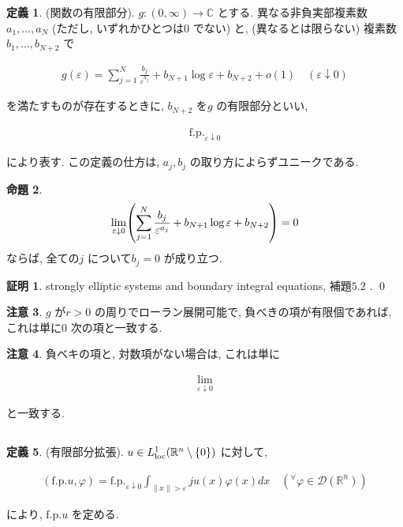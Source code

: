 \documentclass[10pt, fleqn, label-section=none]{bxjsarticle}
\theoremstyle{definition}
\newtheorem{dfn}{定義}[section]
\newtheorem{prop}[dfn]{命題}
\newtheorem*{pf*}{証明}
\newtheorem{remark}[dfn]{注意}
\newcommand{\any}{{}^{\forall}}
\newcommand{\veps}{\varepsilon}
\newcommand{\paren}[1]{\mleft( #1\mright )}
\newcommand{\cbra}[1]{\mleft\{#1\mright\}}
\newcommand{\norm}[1]{\left\|#1\right\|}
\renewcommand{\;}{\, ; \,}
\newcommand{\fp}{\textrm{f.p.}}
\begin{document}
\begin{dfn}(関数の有限部分). $g:(0, \infty)  \rightarrow \mathbb C$ とする. 異なる非負実部複素数$a_1, \ldots, a_N$ (ただし, いずれかひとつは$0$ でない) と, (異なるとは限らない) 複素数$ b_1, \ldots , b_{N+2}$ で

\begin{align*} g(\veps) = \sum_{j = 1}^N \frac{b_j}{\veps^{a_j}} + b_{N+1} \log \veps + b_{N+2} + o(1) \quad(\veps \downarrow 0)  \end{align*}

を満たすものが存在するときに, $b_{N+2}$ を$g$ の有限部分といい, 

\begin{align*} \textrm{f.p.}_{\veps \downarrow 0 }   \end{align*}

により表す. この定義の仕方は, $a_j, b_j$ の取り方によらずユニークである.


\end{dfn}

\begin{prop}

\begin{align*} \lim_{\veps \downarrow 0} \paren{\sum_{j=1}^N \frac{b_j}{\veps^{a_j}} + b_{N+1} \log \veps + b_{N+2}} = 0\end{align*}
ならば, 全ての$j$ について$b_j = 0 $  が成り立つ. 
\end{prop}
\begin{pf*}
strongly elliptic systems and boundary integral equations, 補題$5.2$ .
\qed
\end{pf*}

\begin{remark}$g$ が$r > 0$ の周りでローラン展開可能で, 負べきの項が有限個であれば, これは単に$0$ 次の項と一致する. 

\end{remark}

\begin{remark}負ベキの項と, 対数項がない場合は, これは単に

\begin{align*} \lim_{\veps \downarrow 0 }\end{align*}

と一致する. 

\end{remark}


\subsection{}

\begin{dfn}(有限部分拡張).  $u \in L^1_{\textrm{loc}}(\mathbb R^n \setminus \cbra{0})$ に対して, 

\begin{align*} (\fp u, \varphi) = \fp_{\veps \downarrow 0} \int_{\norm x > \veps } ju(x)\varphi(x) dx \quad (\any \varphi \in \mathcal D (\mathbb R^n) )\end{align*}

により, $\fp u$ を定める. 

\end{dfn}
\end{document}
